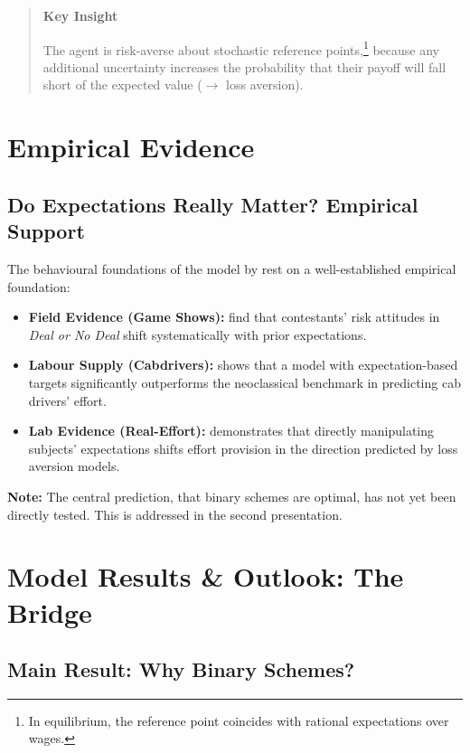 \documentclass[12pt,a4paper,parskip=half]{scrartcl}
\newenvironment{block}[1]{%
  \begin{quote}
  \textbf{#1}\\[0.5em]
  \ignorespaces
}{%
  \end{quote}
}
\newcommand{\alert}[1]{\textcolor{alertred}{\textbf{#1}}}
\begin{document}
\begin{block}{Key Insight}
    The agent is risk-averse about stochastic reference points,\footnote{In equilibrium, the reference point coincides with rational expectations over wages.} because any additional uncertainty increases the probability that their payoff will fall short of the expected value ($\rightarrow$ loss aversion).
\end{block}


\section{Empirical Evidence}

\subsection*{Do Expectations Really Matter? Empirical Support}

The behavioural foundations of the model by \textcite{Herweg2010} rest on a well-established empirical foundation:

\medskip

\begin{itemize}
    \item \textbf{Field Evidence (Game Shows):} \textcite{Post2008} find that contestants' risk attitudes in \textit{Deal or No Deal} shift systematically with prior expectations.
    \item \textbf{Labour Supply (Cabdrivers):} \textcite{Crawford2011} shows that a model with expectation-based targets significantly outperforms the neoclassical benchmark in predicting cab drivers' effort.
    \item \textbf{Lab Evidence (Real-Effort):} \textcite{Abeler2011} demonstrates that directly manipulating subjects' expectations shifts effort provision in the direction predicted by loss aversion models.
\end{itemize}

\medskip

\small\alert{Note:} The central prediction, that binary schemes are optimal, has not yet been directly tested. This is addressed in the second presentation.


\section{Model Results \& Outlook: The Bridge}

\subsection*{Main Result: Why Binary Schemes?}
\end{document}
